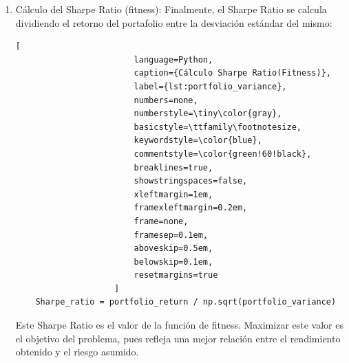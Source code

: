 \documentclass[9pt,a4paper,twoside]{rho-class/rho}
\begin{document}
\begin{enumerate}
                    \begin{lstlisting}[
                        language=Python,
                        caption={Cálculo de la varianza del portafolio},
                        label={lst:portfolio_variance},
                        numbers=none,
                        numberstyle=\tiny\color{gray},
                        basicstyle=\ttfamily\footnotesize,
                        keywordstyle=\color{blue},
                        commentstyle=\color{green!60!black},
                        breaklines=true,
                        showstringspaces=false,
                        xleftmargin=1em,
                        framexleftmargin=0.2em,
                        frame=none,
                        framesep=0.2em,
                        aboveskip=0.3em,
                        belowskip=0.2em,
                        resetmargins=true
                    ]
    portfolio_variance = np.dot(weights, np.dot(cov_matrix, weights))
                    \end{lstlisting}
                    La varianza es una medida del riesgo total del portafolio. La raíz cuadrada de esta varianza nos da la desviación estándar del portafolio, que representa el riesgo asumido al invertir en esta combinación de activos.
                
                \item Cálculo del Sharpe Ratio (fitness): Finalmente, el Sharpe Ratio se calcula dividiendo el retorno del portafolio entre la desviación estándar del mismo:        
                    \begin{lstlisting}[
                        language=Python,
                        caption={Cálculo Sharpe Ratio(Fitness)},
                        label={lst:portfolio_variance},
                        numbers=none,
                        numberstyle=\tiny\color{gray},
                        basicstyle=\ttfamily\footnotesize,
                        keywordstyle=\color{blue},
                        commentstyle=\color{green!60!black},
                        breaklines=true,
                        showstringspaces=false,
                        xleftmargin=1em,
                        framexleftmargin=0.2em,
                        frame=none,
                        framesep=0.1em,
                        aboveskip=0.5em,
                        belowskip=0.1em,
                        resetmargins=true
                    ]
    Sharpe_ratio = portfolio_return / np.sqrt(portfolio_variance)
                    \end{lstlisting}
                    Este Sharpe Ratio es el valor de la función de fitness. Maximizar este valor es el objetivo del problema, pues refleja una mejor relación entre el rendimiento obtenido y el riesgo asumido.
            \end{enumerate}
\end{document}
